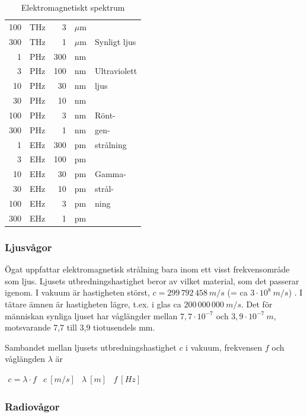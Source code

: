 \begin{table}
\begin{center}
\begin{tabular}{|rl|rl|l|}
100 & THz &   3 & \(\mu\)m & \\ \cline{5-5}
300 & THz &   1 & \(\mu\)m & Synligt ljus \\ \cline{5-5}
  1 & PHz & 300 & nm & \\
  3 & PHz & 100 & nm & Ultraviolett \\
 10 & PHz &  30 & nm & ljus \\ \cline{5-5}
 30 & PHz &  10 & nm & \\
100 & PHz &   3 & nm & Rönt-\\
300 & PHz &   1 & nm & gen-\\
  1 & EHz & 300 & pm & strålning\\ \cline{5-5}
  3 & EHz & 100 & pm & \\
 10 & EHz &  30 & pm & Gamma-\\
 30 & EHz &  10 & pm & strål-\\
100 & EHz &   3 & pm & ning\\
300 & EHz &   1 & pm & \\
\hline
\end{tabular}
\end{center}
\caption{Elektromagnetiskt spektrum}
\label{tab:elektromagnetiskt_spektrum}
\end{table}

\subsubsection{Ljusvågor}

Ögat uppfattar elektromagnetisk strålning bara inom ett visst frekvensområde
som ljus. Ljusets utbredningshastighet beror av vilket material, som det
passerar igenom. I vakuum är hastigheten störst,
\(c = 299\, 792\, 458\ m/s\) (= ca \(3 \cdot 10^8\ m/s\)) \cite{SIbrochure8}.
I tätare ämnen är hastigheten lägre, t.ex. i glas ca \(200\, 000\, 000\ m/s\).
Det för människan synliga ljuset har våglängder mellan \(7,7 \cdot 10^{-7}\)
och \(3,9 \cdot 10^{-7}\ m\), motsvarande 7,7 till 3,9 tiotusendels mm.

Sambandet mellan ljusets utbredningshastighet \(c\) i vakuum, frekvensen \(f\)
och våglängden \(\lambda\) är

\(
\begin{array}{llll}
c = \lambda \cdot f & c \ [m/s] & \lambda \ [m] & f \ [Hz]
\end{array}
\)

\subsubsection{Radiovågor}

